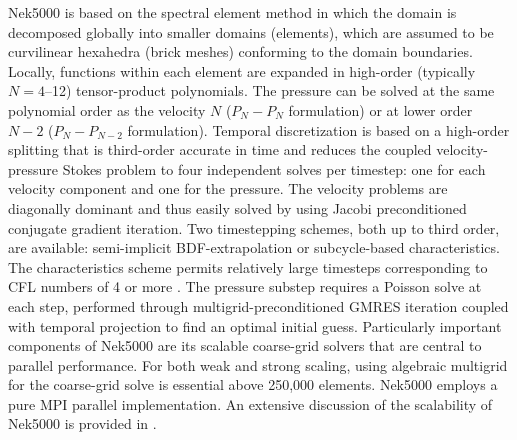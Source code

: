 Nek5000 is based on the spectral element method \cite{patera1984} in which  the
domain is decomposed globally into smaller domains (elements), which are
assumed to be curvilinear hexahedra (brick meshes) conforming to the domain
boundaries. Locally, functions within each element are expanded in high-order
(typically $N=4$--12) tensor-product polynomials.  The pressure can be solved
at the same polynomial order as the velocity $N$ ($P_{N} - P_{N}$ formulation)
or at lower order $N-2$ ($P_{N} - P_{N-2}$ formulation).  Temporal
discretization is based on a high-order splitting that is third-order accurate
in time and reduces the coupled velocity-pressure Stokes problem to four
independent solves per timestep: one for each velocity component and one for
the pressure. The velocity problems are diagonally dominant and thus easily
solved by using Jacobi preconditioned conjugate gradient iteration. Two
timestepping schemes, both up to third order, are available: semi-implicit
BDF-extrapolation or subcycle-based characteristics. The characteristics
scheme permits relatively large timesteps corresponding to CFL numbers
of 4 or more \cite{patel19}. The pressure substep requires a Poisson solve
at each step, performed through multigrid-preconditioned GMRES iteration
coupled with temporal projection to find an optimal initial guess.  
Particularly important components of Nek5000 are its scalable coarse-grid
solvers that are central to parallel performance. For both weak and
strong scaling, using algebraic multigrid for the coarse-grid solve is
essential above 250,000 elements. Nek5000 employs a pure MPI parallel
implementation.  An extensive discussion of the scalability of Nek5000 is
provided in \cite{fischer15,fischer20a}.

